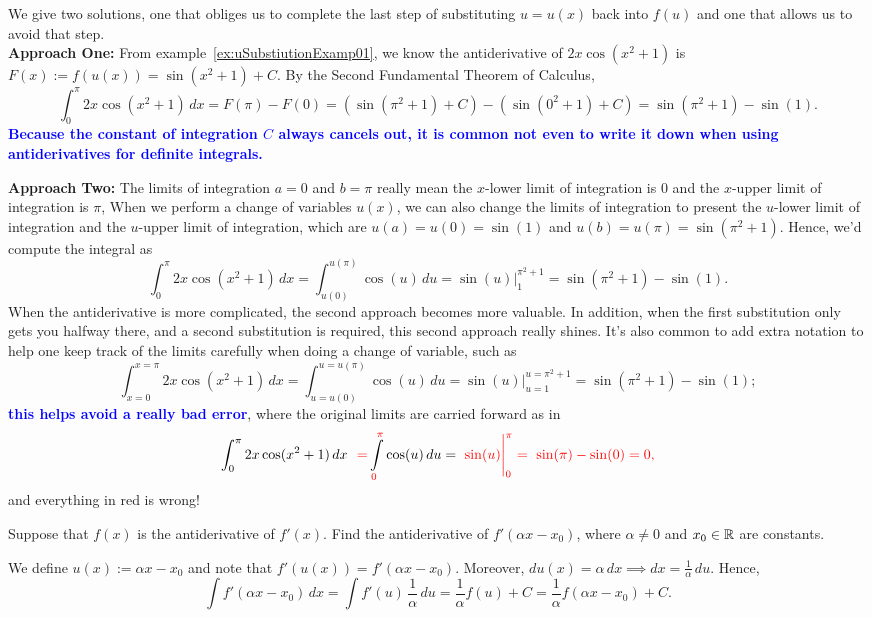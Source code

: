 \solution We give two solutions, one that obliges us to complete the last step of substituting $u = u(x)$ back into $f(u)$ and one that allows us to avoid that step. \\

\textbf{Approach One:} From example~\ref{ex:uSubstiutionExamp01}, we know the antiderivative of $2x \cos(x^2 + 1)$ is $F(x):=f(u(x)) = \sin(x^2 + 1) + C$. By the Second Fundamental Theorem of Calculus,
$$
\int_0^\pi 2x \cos(x^2 + 1) \, dx = F(\pi) - F(0) = \left(\sin(\pi^2 + 1) + C \right) - \left( \sin(0^2 + 1) + C \right) = \sin(\pi^2 + 1) - \sin(1).
$$
\textcolor{blue}{\bf Because the constant of integration $C$ always cancels out, it is common not even to write it down when using antiderivatives for definite integrals.}

\textbf{Approach Two:} The limits of integration $a=0$ and $b=\pi$ really mean the $x$-lower limit of integration is $0$ and the $x$-upper limit of integration is $\pi$, When we perform a change of variables $u(x)$, we can also change the limits of integration to present the $u$-lower limit of integration and the $u$-upper limit of integration, which are $u(a) = u(0) = \sin(1)$ and $u(b) = u(\pi) = \sin(\pi^2 + 1)$. Hence, we'd compute the integral as 
$$
\int_0^\pi 2x \cos(x^2 + 1) \, dx =  \int_{u(0)}^{u(\pi)} \cos(u)\, du = \sin(u) \Bigg|_{1}^{\pi^2 + 1} =  \sin(\pi^2 + 1) - \sin(1).
$$
When the antiderivative is more complicated, the second approach becomes more valuable. In addition, when the first substitution only gets you halfway there, and a second substitution is required, this second approach really shines. It's also common to add extra notation to help one keep track of the limits carefully when doing a change of variable, such as 
$$
\int_{x=0}^{x = \pi} 2x \cos(x^2 + 1) \, dx =  \int_{u = u(0)}^{u = u(\pi)} \cos(u)\, du = \sin(u) \Bigg|_{u = 1}^{u = \pi^2 + 1} =  \sin(\pi^2 + 1) - \sin(1);
$$
\textcolor{blue}{\bf this helps avoid a really bad error}, where the original limits are carried forward as in 
$$
\int_{0}^{\pi} 2x \cos(x^2 + 1) \, dx ~~{\color{red} =} \int\limits_{\textcolor{red}{0}}^{\textcolor{red}{\pi}} \cos(u)\, du = ~\color{red}  \sin(u) \Bigg|_{0}^{\pi} = ~\sin(\pi) - \sin(0) = 0,
$$
and everything in red is wrong!
\Qed



\bigskip

\begin{example} 
\label{ex:uSubstiutionExamp04}
Suppose that $f(x)$ is the antiderivative of $f'(x)$. Find the antiderivative of $f'(\alpha x - x_0)$, where $\alpha \neq 0$  and $x_0 \in \mathbb R$ are constants.
\end{example}
\solution We define $u(x):=\alpha x - x_0 $ and note that $f'(u(x)) = f'(\alpha x - x_0)$. Moreover, $du(x) = \alpha\, dx \implies dx = \frac{1}{\alpha} \, du$. Hence, 
\begin{equation}
    \int f'(\alpha x - x_0)\, dx = \int f'(u)\, \frac{1}{\alpha}\, du =\frac{1}{\alpha} f(u) + C = \frac{1}{\alpha} f(\alpha x - x_0) + C.
\end{equation}
\Qed

